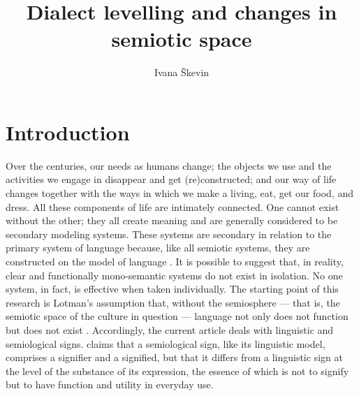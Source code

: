 \documentclass[output=paper]{LSP/langsci}
\author{Ivana Škevin}
\title{Dialect levelling and changes in semiotic space}
\begin{document}
 

 

\section{Introduction}
Over the centuries, our needs as humans change; the objects we use and the activities we engage in disappear and get (re)constructed; and our way of life changes together with the ways in which we make a living, eat, get our food, and dress. All these components of life are intimately connected. One cannot exist without the other; they all create meaning and are generally considered to be secondary modeling systems. These systems are secondary in relation to the primary system of language because, like all semiotic systems, they are constructed on the model of language \citep[viii]{lotman_culture_2009}. It is possible to suggest that, in reality, clear and functionally mono-semantic systems do not exist in isolation. No one system, in fact, is effective when taken individually. The starting point of this research is Lotman's assumption that, without the semiosphere — that is, the semiotic space of the culture in question — language not only does not function but does not exist \citep[218--219]{lotman_semiosphere_1985}. Accordingly, the current article deals with linguistic and semiological signs. \citet[41]{barthes_elements_1968} claims that a semiological sign, like its linguistic model, comprises a signifier and a signified, but that it differs from a linguistic sign at the level of the substance of its expression, the essence of which is not to signify but to have function and utility in everyday use. 
\end{document}
